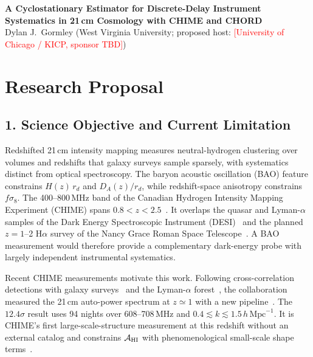 \documentclass[12pt]{article}
\newcommand{\todo}[1]{\textcolor{red}{[#1]}}
\newcommand{\hMpc}{\,h\,\mathrm{Mpc}^{-1}}
\begin{document}
\begin{center}
{\large\bfseries A Cyclostationary Estimator for Discrete-Delay Instrument Systematics in 21\,cm Cosmology with CHIME and CHORD}\\[0.4em]
Dylan J.\ Gormley \quad (West Virginia University; proposed host: \todo{University of Chicago / KICP, sponsor TBD})
\end{center}

\section*{Research Proposal}

\subsection*{1. Science Objective and Current Limitation}

Redshifted 21\,cm intensity mapping measures neutral-hydrogen clustering over volumes and redshifts that galaxy surveys sample sparsely, with systematics distinct from optical spectroscopy. The baryon acoustic oscillation (BAO) feature constrains $H(z)\,r_d$ and $D_A(z)/r_d$, while redshift-space anisotropy constrains $f\sigma_8$. The 400--800\,MHz band of the Canadian Hydrogen Intensity Mapping Experiment (CHIME) spans $0.8<z<2.5$~\cite[Abstract; Sec.~I; Fig.~1]{chime2022}. It overlaps the quasar and Lyman-$\alpha$ samples of the Dark Energy Spectroscopic Instrument (DESI)~\cite[Sec.~2.2; Table~1]{desi2024} and the planned $z=1$--2 H$\alpha$ survey of the Nancy Grace Roman Space Telescope~\cite[Abstract]{roman2021}. A BAO measurement would therefore provide a complementary dark-energy probe with largely independent instrumental systematics.

Recent CHIME measurements motivate this work. Following cross-correlation detections with galaxy surveys~\cite[Abstract]{chime2023} and the Lyman-$\alpha$ forest~\cite[Abstract; Sec.~VI.2; Table~1]{chime2024lya}, the collaboration measured the 21\,cm auto-power spectrum at $z\simeq1$ with a new pipeline~\cite[Abstract; Table~2]{chime2025auto}. The $12.4\sigma$ result uses 94 nights over 608--708\,MHz and $0.4\lesssim k\lesssim1.5\hMpc$. It is CHIME's first large-scale-structure measurement at this redshift without an external catalog and constrains $\mathcal A_{\rm HI}$ with phenomenological small-scale shape terms~\cite[Secs.~6.2.1 and 6.2.3; Eqs.~(74)--(75), (78)]{chime2025auto}.
\end{document}
